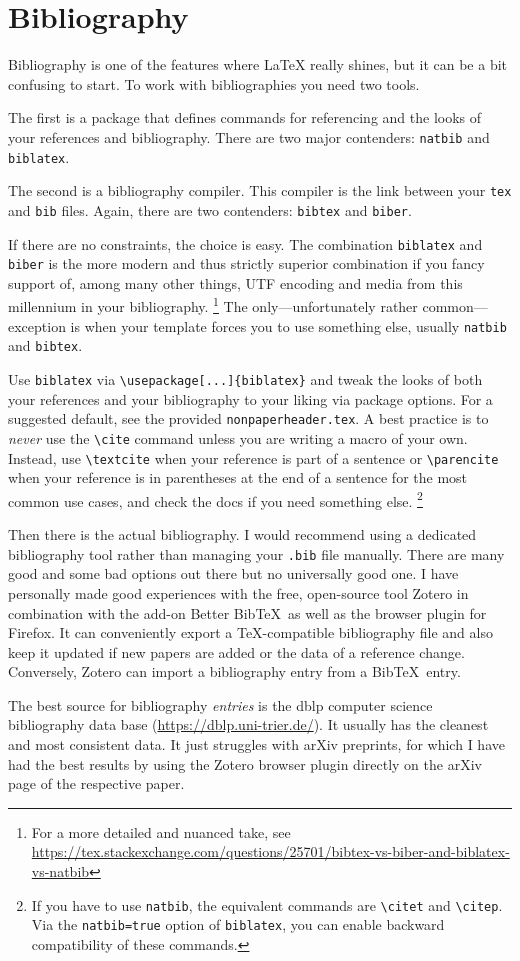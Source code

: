 \section{Bibliography}
Bibliography is one of the features where {\LaTeX} really shines, but it can be a bit confusing to start.
To work with bibliographies you need two tools.

The first is a package that defines commands for referencing and the looks of your references and bibliography.
There are two major contenders: \texttt{natbib} and \texttt{biblatex}.

The second is a bibliography compiler.
This compiler is the link between your \texttt{tex} and \texttt{bib} files.
Again, there are two contenders: \texttt{bibtex} and \texttt{biber}.

If there are no constraints, the choice is easy.
The combination \texttt{biblatex} and \texttt{biber} is the more modern and thus strictly superior combination if you fancy support of, among many other things, UTF encoding and media from this millennium in your bibliography.%
\footnote{For a more detailed and nuanced take, see \url{https://tex.stackexchange.com/questions/25701/bibtex-vs-biber-and-biblatex-vs-natbib}}
The only---unfortunately rather common---exception is when your template forces you to use something else, usually \texttt{natbib} and \texttt{bibtex}.

Use \texttt{biblatex} via \verb|\usepackage[...]{biblatex}| and tweak the looks of both your references and your bibliography to your liking via package options.
For a suggested default, see the provided \texttt{nonpaperheader.tex}.
A best practice is to \emph{never} use the \verb|\cite| command unless you are writing a macro of your own.
Instead, use \verb|\textcite| when your reference is part of a sentence or \verb|\parencite| when your reference is in parentheses at the end of a sentence for the most common use cases, and check the docs if you need something else.%
\footnote{
	If you have to use \texttt{natbib}, the equivalent commands are \texttt{\textbackslash citet} and \texttt{\textbackslash citep}.
	Via the \texttt{natbib=true} option of \texttt{biblatex}, you can enable backward compatibility of these commands.
}

Then there is the actual bibliography.
I would recommend using a dedicated bibliography tool rather than managing your \verb|.bib| file manually.
There are many good and some bad options out there but no universally good one.
I have personally made good experiences with the free, open-source tool Zotero in combination with the add-on Better Bib\TeX\ as well as the browser plugin for Firefox.
It can conveniently export a \TeX-compatible bibliography file and also keep it updated if new papers are added or the data of a reference change.
Conversely, Zotero can import a bibliography entry from a Bib\TeX\ entry.

The best source for bibliography \emph{entries} is the dblp computer science bibliography data base (\url{https://dblp.uni-trier.de/}).
It usually has the cleanest and most consistent data.
It just struggles with arXiv preprints, for which I have had the best results by using the Zotero browser plugin directly on the arXiv page of the respective paper.